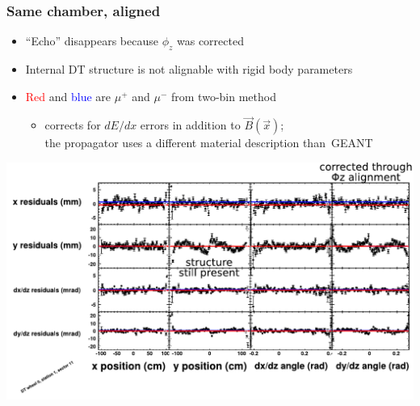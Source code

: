 \documentclass[compress]{beamer}
\begin{document}
\begin{frame}
\frametitle{Same chamber, aligned}
\begin{itemize}
\item ``Echo'' disappears because $\phi_z$ was corrected
\item Internal DT structure is not alignable with rigid body parameters
\item \textcolor{red}{Red} and \textcolor{blue}{blue} are $\mu^+$ and $\mu^-$ from two-bin method
\begin{itemize}
\item corrects for $dE/dx$ errors in addition to $\vec{B}(\vec{x})$; \\
  the propagator uses a different material description \mbox{than GEANT\hspace{-1 cm}}
\end{itemize}
\end{itemize}

\includegraphics[width=\linewidth]{mcfit_misal_and_nongeom_aligned.pdf}
\end{frame}
\end{document}
